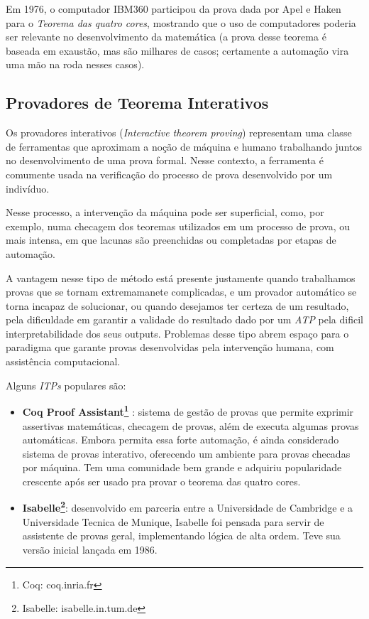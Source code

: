 Em 1976, o computador IBM360 participou da prova dada por Apel e Haken para o \textit{Teorema das quatro cores}, mostrando que o uso de computadores poderia ser relevante no desenvolvimento da matemática (a prova desse teorema é baseada em exaustão, mas são milhares de casos; certamente a automação vira uma mão na roda nesses casos).

\subsection{Provadores de Teorema Interativos}

Os provadores interativos (\textit{Interactive theorem proving}) representam uma classe de ferramentas que aproximam a noção de máquina e humano trabalhando juntos no desenvolvimento de uma prova formal.
Nesse contexto, a ferramenta é comumente usada na verificação do processo de prova desenvolvido por um indivíduo.

Nesse processo, a intervenção da máquina pode ser superficial, como, por exemplo, numa checagem dos teoremas utilizados em um processo de prova, ou mais intensa, em que lacunas são preenchidas ou completadas por etapas de automação.	

A vantagem nesse tipo de método está presente justamente quando trabalhamos provas que se tornam extremamanete complicadas, e um provador automático se torna incapaz de solucionar, ou quando desejamos ter certeza de um resultado, pela dificuldade em garantir a validade do resultado dado por um \textit{ATP} pela dificil interpretabilidade dos seus outputs.
Problemas desse tipo abrem espaço para o paradigma que garante provas desenvolvidas pela intervenção humana, com assistência computacional.

Alguns \textit{ITPs} populares são:
\begin{itemize}
    \item \textbf{Coq Proof Assistant\footnote{Coq: coq.inria.fr}} : sistema de gestão de provas que permite exprimir assertivas matemáticas, checagem de provas, além de executa algumas provas automáticas. Embora permita essa forte automação, é ainda considerado sistema de provas interativo, oferecendo um ambiente para provas checadas por máquina. Tem uma comunidade bem grande e adquiriu popularidade crescente após ser usado pra provar o teorema das quatro cores.

    \item \textbf{Isabelle\footnote{Isabelle: isabelle.in.tum.de}}: desenvolvido em parceria entre a Universidade de Cambridge e a Universidade Tecnica de Munique, Isabelle foi pensada para servir de assistente de provas geral, implementando lógica de alta ordem. Teve sua versão inicial lançada em 1986.
\end{itemize}

